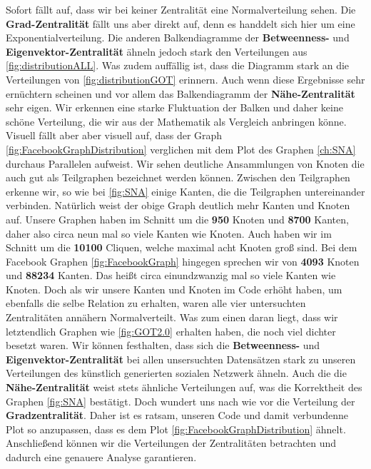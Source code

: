 Sofort fällt auf, dass wir bei keiner Zentralität eine Normalverteilung sehen. Die \textbf{Grad-Zentralität} fällt uns aber direkt auf, denn es handdelt sich hier um eine Exponentialverteilung. Die anderen Balkendiagramme der \textbf{Betweenness-} und \textbf{Eigenvektor-Zentralität} ähneln jedoch stark den Verteilungen aus \ref{fig:distributionALL}. Was zudem auffällig ist, dass die Diagramm stark an die Verteilungen von \ref{fig:distributionGOT} erinnern. Auch wenn diese Ergebnisse sehr ernüchtern scheinen und vor allem das Balkendiagramm der \textbf{Nähe-Zentralität} sehr eigen. Wir erkennen eine starke Fluktuation der Balken und daher keine schöne Verteilung, die wir aus der Mathematik als Vergleich anbringen könne. Visuell fällt aber  aber visuell auf, dass der Graph \ref{fig:FacebookGraphDistribution} verglichen mit dem Plot des Graphen \ref{ch:SNA} durchaus Parallelen aufweist. Wir sehen deutliche Ansammlungen von Knoten die auch gut als Teilgraphen bezeichnet werden können. Zwischen den Teilgraphen erkenne wir, so wie bei \ref{fig:SNA} einige Kanten, die die Teilgraphen untereinander verbinden. Natürlich weist der obige Graph deutlich mehr Kanten und Knoten auf. Unsere Graphen haben im Schnitt um die \textbf{950} Knoten und \textbf{8700} Kanten, daher also circa neun mal so viele Kanten wie Knoten. Auch haben wir im Schnitt um die \textbf{10100} Cliquen, welche maximal acht Knoten groß sind. Bei dem Facebook Graphen \ref{fig:FacebookGraph} hingegen sprechen wir von \textbf{4093} Knoten und \textbf{88234} Kanten. Das heißt circa einundzwanzig mal so viele Kanten wie Knoten. Doch als wir unsere Kanten und Knoten im Code erhöht haben, um ebenfalls die selbe Relation zu erhalten, waren alle vier untersuchten Zentralitäten annähern Normalverteilt. Was zum einen daran liegt, dass wir letztendlich Graphen wie \ref{fig:GOT2.0} erhalten haben, die noch viel dichter besetzt waren. Wir können festhalten, dass sich die \textbf{Betweenness-} und \textbf{Eigenvektor-Zentralität} bei allen unsersuchten Datensätzen stark zu unseren Verteilungen des künstlich generierten sozialen Netzwerk ähneln. Auch die die \textbf{Nähe-Zentralität} weist stets ähnliche Verteilungen auf, was die Korrektheit des Graphen \ref{fig:SNA} bestätigt. Doch wundert uns nach wie vor die Verteilung der \textbf{Gradzentralität}. Daher ist es ratsam, unseren Code und damit verbundenne Plot so anzupassen, dass es dem Plot \ref{fig:FacebookGraphDistribution} ähnelt. Anschließend können wir die Verteilungen der Zentralitäten betrachten und dadurch eine genauere Analyse garantieren. 


